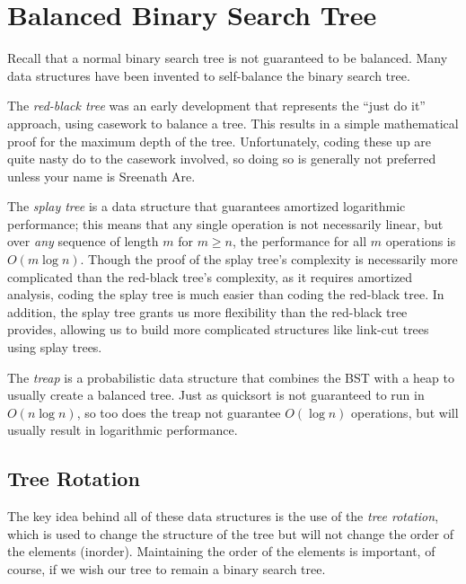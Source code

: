 \section{Balanced Binary Search Tree}

Recall that a normal binary search tree is not guaranteed to be balanced. Many data structures have been invented to self-balance the binary search tree.

The \textit{red-black tree} was an early development that represents the ``just do it'' approach, using casework to balance a tree. This results in a simple mathematical proof for the maximum depth of the tree. Unfortunately, coding these up are quite nasty do to the casework involved, so doing so is generally not preferred unless your name is Sreenath Are.

The \textit{splay tree} is a data structure that guarantees amortized logarithmic performance; this means that any single operation is not necessarily linear, but over \textit{any} sequence of length $m$ for $m \ge n$, the performance for all $m$ operations is $O(m \log{n})$. Though the proof of the splay tree's complexity is necessarily more complicated than the red-black tree's complexity, as it requires amortized analysis, coding the splay tree is much easier than coding the red-black tree. In addition, the splay tree grants us more flexibility than the red-black tree provides, allowing us to build more complicated structures like link-cut trees using splay trees.

The \textit{treap} is a probabilistic data structure that combines the BST with a heap to usually create a balanced tree. Just as quicksort is not guaranteed to run in $O(n\log{n})$, so too does the treap not guarantee $O(\log{n})$ operations, but will usually result in logarithmic performance.

\subsection{Tree Rotation}

The key idea behind all of these data structures is the use of the \textit{tree rotation}, which is used to change the structure of the tree but will not change the order of the elements (inorder). Maintaining the order of the elements is important, of course, if we wish our tree to remain a binary search tree.

